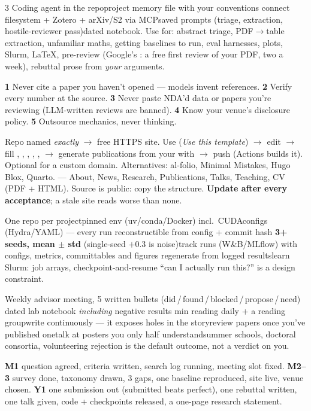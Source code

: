 \documentclass[10pt,a4paper]{article}
\begin{document}
\begin{multicols}{3}
Coding agent in the repo\dt project memory file with your conventions\dt
connect filesystem + Zotero + arXiv/S2 via MCP\dt saved prompts (triage,
extraction, hostile-reviewer pass)\dt dated  notebook.
Use for: abstract triage, PDF$\to$table extraction, unfamiliar maths, getting
baselines to run, eval harnesses, plots, Slurm, LaTeX, pre-review (Google's
: a free first review of your
PDF, two a week), rebuttal prose from \emph{your} arguments.
\begin{flag}
\textbf{1} Never cite a paper you haven't opened --- models invent references.
\textbf{2} Verify every number at the source. \textbf{3} Never paste NDA'd data
or papers you're reviewing (LLM-written reviews are banned). \textbf{4} Know
your venue's disclosure policy. \textbf{5} Outsource mechanics, never thinking.
\end{flag}

Repo named \emph{exactly}  $\to$ free HTTPS site. Use
(\emph{Use this template}) $\to$ edit  $\to$ fill
, , , ,
,  $\to$ generate publications from your 
with  $\to$ push (Actions builds it). Optional
 for a custom domain. Alternatives: al-folio, Minimal Mistakes,
Hugo Blox, Quarto.
 --- About, News,
Research, Publications, Talks, Teaching, CV (PDF + HTML). Source is public:
copy the structure. \textbf{Update after every acceptance}; a stale site reads
worse than none.

One repo per project\dt pinned env (uv/conda/Docker) incl.\ CUDA\dt configs
(Hydra/YAML) --- every run reconstructible from config + commit hash\dt
\textbf{3+ seeds, mean $\pm$ std} (single-seed $+0.3$ is noise)\dt track runs
(W\&B/MLflow) with configs, metrics, commit\dt tables and figures regenerate
from logged results\dt learn Slurm: job arrays, checkpoint-and-resume\dt
``can I actually run this?'' is a design constraint.

Weekly advisor meeting, 5 written bullets (did\,/\,found\,/\,blocked\,/\,propose\,/\,need)\dt
dated lab notebook \emph{including} negative results min reading
daily + a reading group\dt write continuously --- it exposes holes in the
story\dt review papers once you've published one\dt talk at posters you only
half understand\dt summer schools, doctoral consortia, volunteering\dt
rejection is the default outcome, not a verdict on you.

\textbf{M1} question agreed, criteria written, search log running, meeting slot
fixed. \textbf{M2--3} survey done, taxonomy drawn, 3 gaps, one baseline
reproduced, site live, venue chosen. \textbf{Y1} one submission out
(submitted beats perfect), one rebuttal written, one talk given, code +
checkpoints released, a one-page research statement.

\end{multicols}
\end{document}
